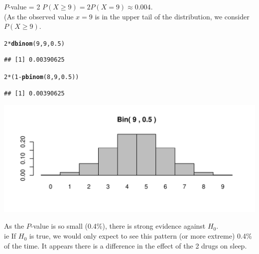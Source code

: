 \documentclass[t,xcolor=pdftex,dvipsnames,table]{beamer}
\makeatletter
\def\maxwidth{ %
  \ifdim\Gin@nat@width>\linewidth
    \linewidth
  \else
    \Gin@nat@width
  \fi
}
\newcommand{\hlnum}[1]{\textcolor[rgb]{0.686,0.059,0.569}{#1}}%
\newcommand{\hlopt}[1]{\textcolor[rgb]{0,0,0}{#1}}%
\newcommand{\hlstd}[1]{\textcolor[rgb]{0.345,0.345,0.345}{#1}}%
\newcommand{\hlkwd}[1]{\textcolor[rgb]{0.737,0.353,0.396}{\textbf{#1}}}%
\newenvironment{kframe}{%
 \def\at@end@of@kframe{}%
 \ifinner\ifhmode%
  \def\at@end@of@kframe{\end{minipage}}%
  \begin{minipage}{\columnwidth}%
 \fi\fi%
 \def\FrameCommand##1{\hskip\@totalleftmargin \hskip-\fboxsep
 \colorbox{shadecolor}{##1}\hskip-\fboxsep
     \hskip-\linewidth \hskip-\@totalleftmargin \hskip\columnwidth}%
 \MakeFramed {\advance\hsize-\width
   \@totalleftmargin\z@ \linewidth\hsize
   \@setminipage}}%
 {\par\unskip\endMakeFramed%
 \at@end@of@kframe}
\newenvironment{knitrout}{}{} %
\makeatother
\begin{document}
\begin{frame}[fragile]{}

 $P$-value = 2 $P( X \geq 9) = 2 P( X = 9) \approx 0.004$. \\
(As the observed value $x=9$ is in the upper tail of the distribution, we consider $P(X \geq 9)$.

\begin{knitrout}
\color{fgcolor}\begin{kframe}
\begin{alltt}
\hlnum{2}\hlopt{*} \hlkwd{dbinom}\hlstd{(}\hlnum{9}\hlstd{,}\hlnum{9}\hlstd{,}\hlnum{0.5}\hlstd{)}
\end{alltt}
\begin{verbatim}
## [1] 0.00390625
\end{verbatim}
\begin{alltt}
\hlnum{2}\hlopt{*} \hlstd{(}\hlnum{1}\hlopt{-}\hlkwd{pbinom}\hlstd{(}\hlnum{8}\hlstd{,}\hlnum{9}\hlstd{,}\hlnum{0.5}\hlstd{))}
\end{alltt}
\begin{verbatim}
## [1] 0.00390625
\end{verbatim}
\end{kframe}
\end{knitrout}

\begin{knitrout}
\color{fgcolor}
\includegraphics[width=\maxwidth]{figure/unnamed-chunk-11-1} 

\end{knitrout}
\end{frame}


\begin{frame}{}

 As the $P$-value is so small (0.4\%), there is strong evidence against $H_{0}$. \\
ie If $H_{0}$ is true, we would only expect to see this pattern (or more extreme) 0.4\% of the time. It appears there is a difference in the effect of the 2 drugs on sleep.
\end{frame}
\end{document}
